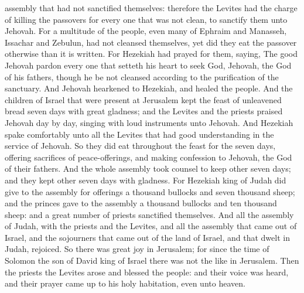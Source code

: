 assembly that had not sanctified themselves: therefore the Levites had the charge of killing the passovers for every one that was not clean, to sanctify them unto Jehovah. For a multitude of the people, even many of Ephraim and Manasseh, Issachar and Zebulun, had not cleansed themselves, yet did they eat the passover otherwise than it is written. For Hezekiah had prayed for them, saying, The good Jehovah pardon every one that setteth his heart to seek God, Jehovah, the God of his fathers, though he be not cleansed according to the purification of the sanctuary. And Jehovah hearkened to Hezekiah, and healed the people. And the children of Israel that were present at Jerusalem kept the feast of unleavened bread seven days with great gladness; and the Levites and the priests praised Jehovah day by day, singing with loud instruments unto Jehovah. And Hezekiah spake comfortably unto all the Levites that had good understanding in the service of Jehovah. So they did eat throughout the feast for the seven days, offering sacrifices of peace-offerings, and making confession to Jehovah, the God of their fathers.  And the whole assembly took counsel to keep other seven days; and they kept other seven days with gladness. For Hezekiah king of Judah did give to the assembly for offerings a thousand bullocks and seven thousand sheep; and the princes gave to the assembly a thousand bullocks and ten thousand sheep: and a great number of priests sanctified themselves. And all the assembly of Judah, with the priests and the Levites, and all the assembly that came out of Israel, and the sojourners that came out of the land of Israel, and that dwelt in Judah, rejoiced. So there was great joy in Jerusalem; for since the time of Solomon the son of David king of Israel there was not the like in Jerusalem. Then the priests the Levites arose and blessed the people: and their voice was heard, and their prayer came up to his holy habitation, even unto heaven. 

